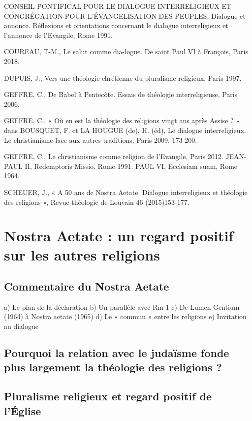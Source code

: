 CONSEIL  PONTIFICAL  POUR  LE  DIALOGUE  INTERRELIGIEUX  ET  CONGRÉGATION  POUR L’ÉVANGELISATION  DES  PEUPLES,  Dialogue  et  annonce.  Réflexions  et  orientations concernant  le  dialogue  interreligieux  et  l’annonce  de  l’Evangile, Rome  1991. 

COUREAU, T-M.,  Le  salut  comme  dia-logue. De  saint  Paul  VI à François, Paris  2018. 

DUPUIS, J.,  Vers  une  théologie  chrétienne  du pluralisme  religieux, Paris  1997. 

GEFFRE, C.,  De  Babel  à Pentecôte. Essais  de  théologie  interreligieuse, Paris  2006. 

GEFFRE,  C.,  «  Où  en  est  la  théologie  des  religions  vingt  ans  après  Assise  ?  »  dans  BOUSQUET, F.  et  LA  HOUGUE  (de),  H.  (éd),  Le  dialogue  interreligieux.  Le  christianisme  face  aux autres  traditions, Paris  2009, 173-200. 

GEFFRE, C.,  Le  christianisme  comme  religion de  l’Evangile, Paris  2012. JEAN-PAUL  II,  Redemptoris  Missio,  Rome  1991. PAUL  VI,  Ecclesiam  suam, Rome  1964. 

SCHEUER,  J.,  «  A  50  ans  de  Nostra  Aetate.  Dialogue  interreligieux  et  théologie  des religions  »,  Revue  théologie  de  Louvain  46 (2015)153-177. 
\section{Nostra Aetate  :  un  regard  positif sur  les  autres  religions}
    
 \subsection{Commentaire  du Nostra Aetate }  
 
 a)  Le  plan  de  la  déclaration b)  Un parallèle  avec  Rm  1 c)  De  Lumen Gentium  (1964) à  Nostra aetate  (1965) d)  Le  «  commun  »  entre  les  religions e)  Invitation au dialogue
 
 
 \subsection{Pourquoi  la  relation  avec  le  judaïsme  fonde  plus  largement  la  théologie  des religions  ?}  
  \subsection{Pluralisme  religieux  et  regard positif  de  l’Église}  
  
